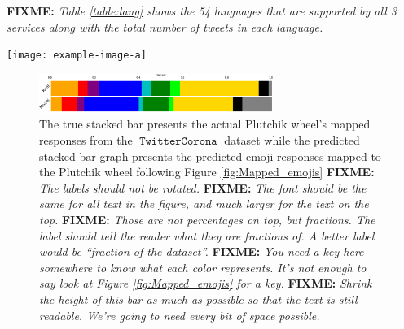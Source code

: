 \documentclass[11pt]{article}
\newcommand{\fixme}[1]{{\color{red} \textbf{FIXME:} {\textit {#1}}}}
\DeclareMathOperator{\corona}{\texttt{TwitterCorona}}
\begin{document}
\fixme{Table \ref{table:lang} shows the 54 languages that are supported by all 3 services along with the total number of tweets in each language.}

\begin{table}
    \centering
    \texttt{[image: example-image-a]}
    \caption{
        Language stats.
        \fixme{Ideally we would add this table, but if you don't have time we can take it out (or maybe I'll have time to create it).}
    }
    \label{table:lang}
\end{table}

\begin{figure}
    \centering
    \includegraphics[height=0.5in]{images/true_pred_fix.pdf}
    \caption{
        The true stacked bar presents the actual Plutchik wheel's mapped responses from the $\corona$ dataset while the predicted stacked bar graph presents the predicted emoji responses mapped to the Plutchik wheel following Figure  \ref{fig:Mapped_emojis} 
        \fixme{The labels should not be rotated.}
        \fixme{The font should be the same for all text in the figure, and much larger for the text on the top.}
        \fixme{
            Those are not percentages on top, but fractions.
            The label should tell the reader what they are fractions of.
            A better label would be ``fraction of the dataset''.
        }
        \fixme{
            You need a key here somewhere to know what each color represents.
            It's not enough to say look at Figure \ref{fig:Mapped_emojis} for a key.
        }
        \fixme{
            Shrink the height of this bar as much as possible so that the text is still readable.
            We're going to need every bit of space possible.
        }
    }
    \label{fig:actual vs pred}
\end{figure}
\end{document}

